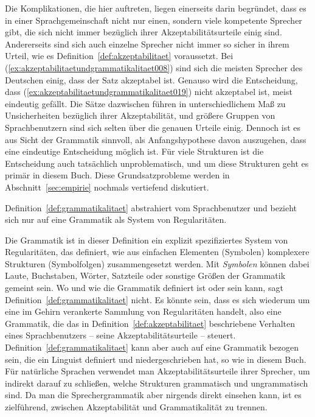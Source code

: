 Die Komplikationen, die hier auftreten, liegen einerseits darin begründet, dass es in einer Sprachgemeinschaft nicht nur einen, sondern viele kompetente Sprecher gibt, die sich nicht immer bezüglich ihrer Akzeptabilitätsurteile einig sind.
Andererseits sind sich auch einzelne Sprecher nicht immer so sicher in ihrem Urteil, wie es Definition~\ref{def:akzeptabilitaet} voraussetzt.
Bei (\ref{ex:akzeptabilitaetundgrammatikalitaet008}) sind sich die meisten Sprecher des Deutschen einig, dass der Satz akzeptabel ist.
Genauso wird die Entscheidung, dass (\ref{ex:akzeptabilitaetundgrammatikalitaet019}) nicht akzeptabel ist, meist eindeutig gefällt.
Die Sätze dazwischen führen in unterschiedlichem Maß zu Unsicherheiten bezüglich ihrer Akzeptabilität, und größere Gruppen von Sprachbenutzern sind sich selten über die genauen Urteile einig.
Dennoch ist es aus Sicht der Grammatik sinnvoll, als Anfangshypothese davon auszugehen, dass eine eindeutige Entscheidung möglich ist.
Für viele Strukturen ist die Entscheidung auch tatsächlich unproblematisch, und um diese Strukturen geht es primär in diesem Buch.
Diese Grundsatzprobleme werden in Abschnitt~\ref{sec:empirie} nochmals vertiefend diskutiert.

Definition~\ref{def:grammatikalitaet} abstrahiert vom Sprachbenutzer und bezieht sich nur auf eine Grammatik als System von Regularitäten.


Die Grammatik ist in dieser Definition ein explizit spezifiziertes System von Regularitäten, das definiert, wie aus einfachen Elementen (Symbolen) komplexere Strukturen (Symbolfolgen) zusammengesetzt werden.
Mit \textit{Symbolen} können dabei Laute, Buchstaben, Wörter, Satzteile oder sonstige Größen der Grammatik gemeint sein.
Wo und wie die Grammatik definiert ist oder sein kann, sagt Definition~\ref{def:grammatikalitaet} nicht.
Es könnte sein, dass es sich wiederum um eine im Gehirn verankerte Sammlung von Regularitäten handelt, also eine Grammatik, die das in Definition~\ref{def:akzeptabilitaet} beschriebene Verhalten eines Sprachbenutzers -- seine Akzeptabilitätsurteile -- steuert.
Definition~\ref{def:grammatikalitaet} kann aber auch auf eine Grammatik bezogen sein, die ein Linguist definiert und niedergeschrieben hat, so wie in diesem Buch.
Für natürliche Sprachen verwendet man Akzeptabilitätsurteile ihrer Sprecher, um indirekt darauf zu schließen, welche Strukturen grammatisch und ungrammatisch sind.
Da man die Sprechergrammatik aber nirgends direkt einsehen kann, ist es zielführend, zwischen Akzeptabilität und Grammatikalität zu trennen.

